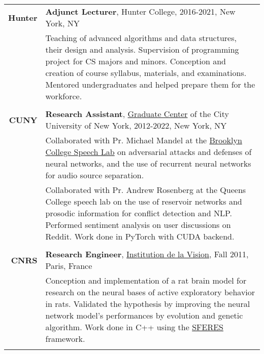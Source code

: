 \documentclass[a4paper,10pt]{article}
\begin{document}
\begin{tabular}{r|p{160mm}}
        \textbf{Hunter} & \textbf{Adjunct Lecturer}, Hunter College, 2016-2021, New York, NY\\
        & \small{Teaching of advanced algorithms and data structures, their design and analysis. Supervision of programming project for CS majors and minors. Conception and creation of course syllabus, materials, and examinations. Mentored undergraduates and helped prepare them for the workforce. }\\
        \multicolumn{2}{c}{} \vspace{-1.5mm} \\
        
        \textbf{CUNY} & \textbf{Research Assistant}, \href{https://www.gc.cuny.edu/}{Graduate Center} of the City University of New York, 2012-2022, New York, NY \\
        & \small{Collaborated with Pr. Michael Mandel at the \href{https://github.com/grezesf/Resume/blob/bcbe079a5833f0be5bcf5f0fd9cfc6c8bdc12b10/files/SpeechLab.pdf}{Brooklyn College Speech Lab} on adversarial attacks and defenses of neural networks, and the use of recurrent neural networks for audio source separation.}\\
        & \small{Collaborated with Pr. Andrew Rosenberg at the Queens College speech lab on the use of reservoir networks and prosodic information for conflict detection and NLP. Performed sentiment analysis on user discussions on Reddit. Work done in PyTorch with CUDA backend.}\\
        \multicolumn{2}{c}{} \vspace{-1.5mm} \\

        \textbf{CNRS} & \textbf{Research Engineer}, \href{https://www.institut-vision.org/index.php/en/research/aging-vision-and-action}{Institution de la Vision}, Fall 2011, Paris, France\\
        & \small{Conception and implementation of a rat brain model for research on the neural bases of active exploratory behavior in rats. Validated the hypothesis by improving the neural network model's performances by evolution and genetic algorithm. Work done in C++ using the \href{https://github.com/sferes2/sferes2}{SFERES} framework.}\\
        \multicolumn{2}{c}{} \vspace{-1.5mm} \\
        

\end{tabular}
\end{document}
